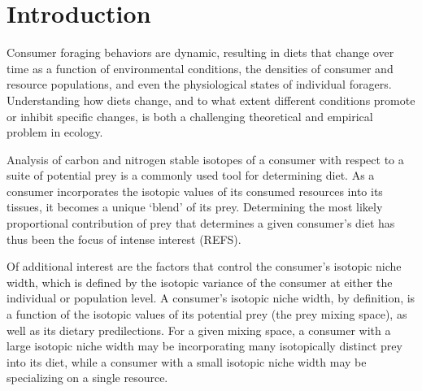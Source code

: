 \documentclass{frontiersSCNS}
\begin{document}
\section{Introduction}

Consumer foraging behaviors are dynamic, resulting in diets that change over time as a function of environmental conditions, the densities of consumer and resource populations, and even the physiological states of individual foragers.
Understanding how diets change, and to what extent different conditions promote or inhibit specific changes, is both a challenging theoretical and empirical problem in ecology.

Analysis of carbon and nitrogen stable isotopes of a consumer with respect to a suite of potential prey is a commonly used tool for determining diet.
As a consumer incorporates the isotopic values of its consumed resources into its tissues, it becomes a unique `blend' of its prey.
Determining the most likely proportional contribution of prey that determines a given consumer's diet has thus been the focus of intense interest (REFS).

Of additional interest are the factors that control the consumer's isotopic niche width, which is defined by the isotopic variance of the consumer at either the individual or population level.
A consumer's isotopic niche width, by definition, is a function of the isotopic values of its potential prey (the prey mixing space), as well as its dietary predilections.
For a given mixing space, a consumer with a large isotopic niche width may be incorporating many isotopically distinct prey into its diet, while a consumer with a small isotopic niche width may be specializing on a single resource.





\end{document}
